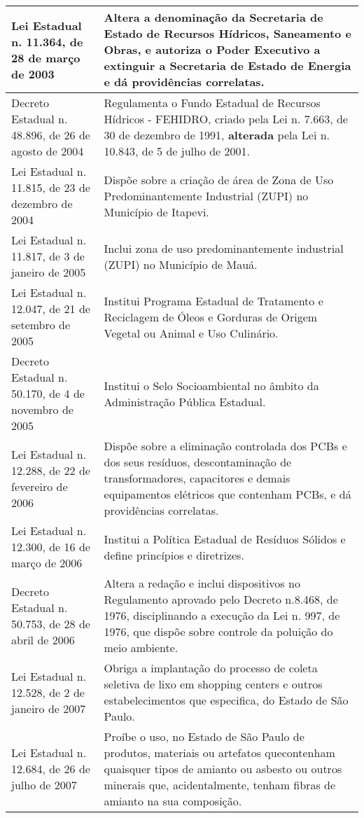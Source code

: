 \begin{center}
\begin{longtable}{|p{}|p{}|}
			\hline
			Lei  Estadual  n.  11.364,  de  28 de março de 2003 & Altera   a   denominação   da   Secretaria   de   Estado   de   Recursos   Hídricos, Saneamento e Obras, e autoriza o Poder Executivo a extinguir a Secretaria de Estado de Energia e dá providências correlatas. \\
			\hline
			Decreto Estadual n. 48.896, de 26 de agosto de 2004 & Regulamenta o Fundo Estadual de Recursos Hídricos  - FEHIDRO, criado pela Lei n. 7.663, de 30 de dezembro de 1991, \textbf{alterada} pela Lei n. 10.843, de 5 de julho de 2001. \\
			\hline
			Lei  Estadual  n.  11.815,  de  23 de dezembro de 2004 & Dispõe sobre a criação de área de Zona de Uso Predominantemente Industrial (ZUPI) no Município de Itapevi. \\
			\hline
			Lei Estadual n. 11.817, de 3 de janeiro de 2005 & Inclui zona de uso predominantemente industrial (ZUPI) no Município de Mauá. \\
			\hline
			Lei  Estadual  n.  12.047,  de  21 de setembro de 2005 & Institui Programa Estadual de Tratamento e Reciclagem de Óleos e Gorduras de Origem Vegetal ou Animal e Uso Culinário. \\
			\hline
			Decreto Estadual n. 50.170, de 4 de novembro de 2005 & Institui o Selo Socioambiental no âmbito da Administração Pública Estadual. \\
			\hline
			Lei  Estadual  n.  12.288,  de  22 de fevereiro de 2006 & Dispõe  sobre  a  eliminação  controlada  dos  PCBs  e  dos  seus  resíduos, descontaminação   de   transformadores,   capacitores   e   demais   equipamentos elétricos que contenham PCBs, e dá providências correlatas. \\
			\hline
			Lei  Estadual  n.  12.300,  de  16 de março de 2006 & Institui a Política Estadual de Resíduos Sólidos e define princípios e diretrizes. \\
			\hline
			Decreto Estadual n. 50.753, de 28 de abril de 2006 & Altera a redação e inclui dispositivos no Regulamento aprovado pelo Decreto n.\newline{}8.468, de 1976, disciplinando a execução da Lei n. 997, de 1976, que dispõe sobre controle da poluição do meio ambiente. \\
			\hline
			Lei Estadual n. 12.528, de 2 de janeiro de 2007 & Obriga  a  implantação  do  processo  de  coleta  seletiva  de  lixo  em  shopping centers e outros estabelecimentos que especifica, do Estado de São Paulo. \\
			\hline
			Lei  Estadual  n.  12.684,  de  26 de julho de 2007 & Proíbe o uso, no Estado de São Paulo de produtos, materiais ou artefatos que\newline{}contenham  quaisquer  tipos  de  amianto  ou  asbesto  ou  outros  minerais  que, acidentalmente, tenham fibras de amianto na sua composição. \\

\end{longtable}
\end{center}
